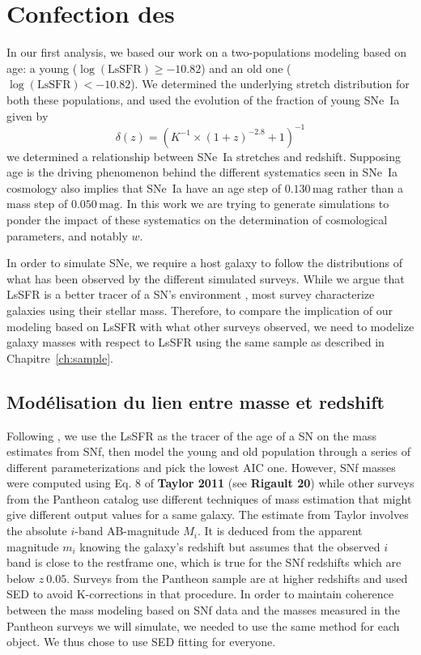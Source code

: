\documentclass[../main/main.tex]{subfiles}
\begin{document}
\section{Confection des \hostlib}\label{sec:hmake}

In our first analysis, we based our work on a two-populations modeling based on
age: a young ($\log(\mathrm{LsSFR}) \geq -10.82$) and an old one
($\log(\mathrm{LsSFR}) < -10.82$). We determined the underlying stretch
distribution for both these populations, and used the evolution of the fraction
of young SNe~Ia given by
\begin{equation}\label{eq:delta}
    \delta(z) = \left(K^{-1}\times\left(1+z\right)^{-2.8}+1\right)^{-1} 
\end{equation}
we determined a relationship between SNe~Ia stretches and redshift. Supposing
age is the driving phenomenon behind the different systematics seen in SNe~Ia
cosmology also implies that SNe~Ia have an age step of $0.130\,\mathrm{mag}$
rather than a mass step of $0.050\,\mathrm{mag}$. In this work we are trying to
generate simulations to ponder the impact of these systematics on the
determination of cosmological parameters, and notably $w$.

In order to simulate SNe, we require a host galaxy to follow the distributions
of what has been observed by the different simulated surveys. While we argue
that LsSFR is a better tracer of a SN's environment \citep{briday2021}, most
survey characterize galaxies using their stellar mass. Therefore, to compare the
implication of our modeling based on LsSFR with what other surveys observed, we
need to modelize galaxy masses with respect to LsSFR using the same sample as
described in Chapitre~\ref{ch:sample}.

\subsection{Modélisation du lien entre masse et redshift}\label{ssec:mmod}

Following \cite{nicolas2021}, we use the LsSFR as the tracer of the age of a SN on
the mass estimates from SNf, then model the young and old population through a
series of different parameterizations and pick the lowest AIC one. However, SNf
masses were computed using Eq. 8 of \textbf{Taylor 2011} (see \textbf{Rigault
20}) while other surveys from the Pantheon catalog use different techniques of
mass estimation that might give different output values for a same galaxy. The
estimate from Taylor involves the absolute $i$-band AB-magnitude $M_i$. It is
deduced from the apparent magnitude $m_i$ knowing the galaxy's redshift but
assumes that the observed $i$ band is close to the restframe one, which is true
for the SNf redshifts which are below $z~0.05$. Surveys from the Pantheon sample
are at higher redshifts and used SED to avoid K-corrections in that procedure.
In order to maintain coherence between the mass modeling based on SNf data and
the masses measured in the Pantheon surveys we will simulate, we needed to use
the same method for each object. We thus chose to use SED fitting for everyone.
\end{document}

